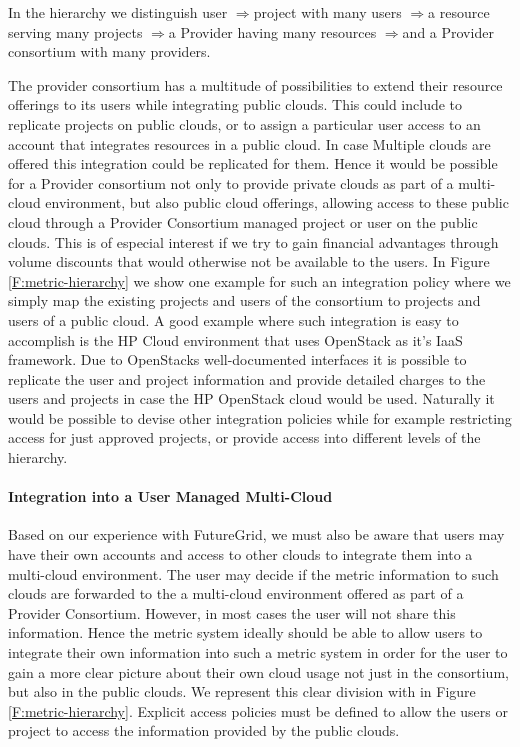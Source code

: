 \documentclass{tex/sig-alternate-2013}
\newcommand{\todo}[1]{{\color{red}{#1}}}
\begin{document}
{\newcommand{\ARROW}{$\Rightarrow$}

\todo{READ}

In the hierarchy we distinguish user \ARROW project with many users \ARROW a resource serving many projects \ARROW a Provider having many resources \ARROW and a Provider consortium with many providers.

The provider consortium has a multitude of possibilities to extend their resource offerings to its users while integrating public clouds. This could include to replicate projects on public clouds, or to assign a particular user access to an account that integrates resources in a public cloud. In case Multiple clouds are offered this integration could be replicated for them. Hence it would be possible for a Provider consortium not only to provide private clouds as part of a multi-cloud environment, but also public cloud offerings, allowing access to these public cloud through a Provider Consortium managed project or user on the public clouds. This is of especial interest if we try to gain financial advantages through volume discounts that would otherwise not be available to the users.  In Figure \ref{F:metric-hierarchy} we show one example for such an integration policy where we simply map the existing projects and users of the consortium to projects and users of a public cloud. A good example where such integration is easy to accomplish is the HP Cloud environment that uses OpenStack as it's IaaS framework. Due to OpenStacks well-documented interfaces it is possible to replicate the user and project information and provide detailed charges to the users and projects in case the HP OpenStack cloud would be used. Naturally it would be possible to devise other integration policies while for example restricting access for just approved projects, or provide access into different levels of the hierarchy.

\paragraph{Integration into a User Managed Multi-Cloud}

\todo{READ}

Based on our experience with FutureGrid, we must also be aware that users may have their own accounts and access to other clouds to integrate them into a multi-cloud environment. The user may decide if the metric information to such clouds are forwarded to the a multi-cloud environment offered as part of a Provider Consortium. However, in most cases the user will not share this information. Hence the metric system ideally should be able to allow users to integrate their own information into such a metric system in order for the user to gain a more clear picture about their own cloud usage not just in the consortium, but also in the public clouds. We represent this clear division with in Figure \ref{F:metric-hierarchy}. Explicit access policies must be defined to allow the users or project to access the information provided by the public clouds.


}
\end{document}
